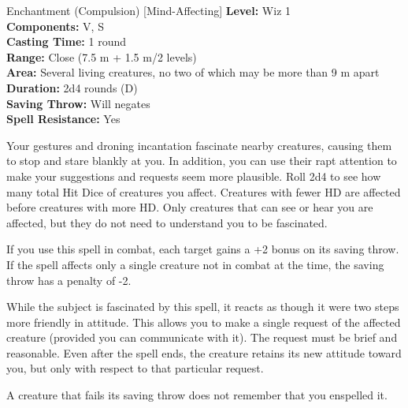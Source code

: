 {Enchantment (Compulsion) [Mind-Affecting]}
{
	\textbf{Level:}
	Wiz 1\\
	\textbf{Components:}
	V, S\\
	\textbf{Casting Time:}
	1 round\\
	\textbf{Range:}
	Close (7.5 m + 1.5 m/2 levels)\\
	\textbf{Area:}
	Several living creatures, no two of which may be more than 9 m apart\\
	\textbf{Duration:}
	2d4 rounds (D)\\
	\textbf{Saving Throw:}
	Will negates\\
	\textbf{Spell Resistance:}
	Yes\\
}
{
	Your gestures and droning incantation fascinate nearby creatures, causing them to stop and stare blankly at you. In addition, you can use their rapt attention to make your suggestions and requests seem more plausible. Roll 2d4 to see how many total Hit Dice of creatures you affect. Creatures with fewer HD are affected before creatures with more HD. Only creatures that can see or hear you are affected, but they do not need to understand you to be fascinated.

	If you use this spell in combat, each target gains a +2 bonus on its saving throw. If the spell affects only a single creature not in combat at the time, the saving throw has a penalty of -2.

	While the subject is fascinated by this spell, it reacts as though it were two steps more friendly in attitude. This allows you to make a single request of the affected creature (provided you can communicate with it). The request must be brief and reasonable. Even after the spell ends, the creature retains its new attitude toward you, but only with respect to that particular request.

	A creature that fails its saving throw does not remember that you enspelled it.

}
